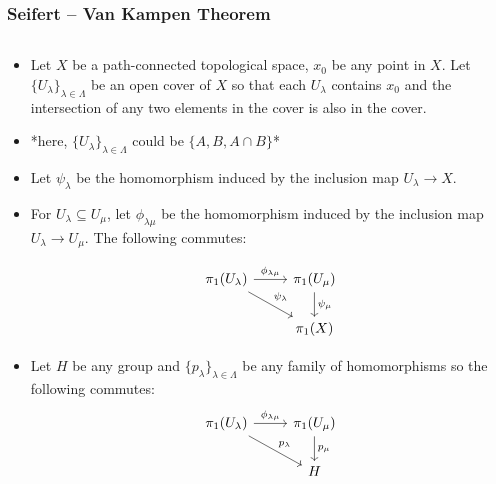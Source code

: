 \documentclass[8pt]{beamer}
\begin{document}
  \begin{frame}
    \frametitle{Seifert -- Van Kampen Theorem}
    \begin{columns}
      \begin{column}[T]{0.5\textwidth}
        \begin{itemize}
          \item<1-> Let $X$ be a path-connected topological space, $x_0$ be any point
            in $X$. Let $\{U_\lambda\}_{\lambda \in \Lambda}$ be an open cover
            of $X$ so that each $U_\lambda$ contains $x_0$ and the intersection
            of any two elements in the cover is also in the cover.
          \item<2-> *here, $\{U_\lambda\}_{\lambda \in \Lambda}$ could be $\{A, B,
            A \cap B\}$*
          \item<3-> Let $\psi_\lambda$ be the homomorphism induced by the inclusion
                map $U_\lambda \rightarrow X$.
          \item<4->
            \begin{minipage}[t]{0.5\textwidth}
              \vspace{-5.5mm}
              For $U_\lambda \subseteq U_\mu$, let $\phi_{\lambda\mu}$ be the
              homomorphism induced by the inclusion map $U_\lambda \rightarrow
              U_\mu$. The following commutes:
            \end{minipage}%
            \begin{minipage}[t]{0.5\textwidth}
              \centering
              \vspace{-12mm}
                \[\begin{tikzcd}[ampersand replacement=\&]
                  \pi_1(U_\lambda) \ar[rd, "\psi_\lambda"]
                  \ar[r,"\phi_{\lambda\mu}"] \& \pi_1(U_\mu) \ar[d, "\psi_\mu"]
                  \\ \& \pi_1(X)
                  \end{tikzcd}\]
            \end{minipage}
          \item<5-> Let $H$ be any group and $\{p_\lambda\}_{\lambda \in \Lambda}$
            be any family of homomorphisms so the following commutes:
            \[\begin{tikzcd}[ampersand replacement=\&]
              \pi_1(U_\lambda) \ar[rd, "p_\lambda"]
              \ar[r,"\phi_{\lambda\mu}"] \& \pi_1(U_\mu) \ar[d, "p_\mu"]\\
                  \& H
              \end{tikzcd}\]

\end{itemize}
\end{column}
\end{columns}
\end{frame}
\end{document}
